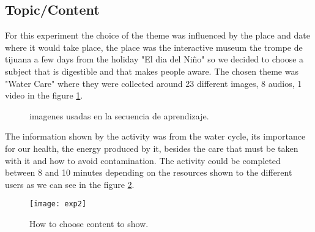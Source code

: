 \subsection{Topic/Content}
For this experiment the choice of the theme was influenced by the place and date where it would take place, the place was the interactive museum the trompe de tijuana a few days from the holiday "El dia del Niño" so we decided to choose a subject that is digestible and that makes people aware. The chosen theme was "Water Care" where they were collected around 23 different images, 8 audios, 1 video in the figure \ref{fig:agua}.
\begin{figure}[htbp]
\centering
{}\hspace{10mm}
\vspace{10mm}
\caption{imagenes usadas en la secuencia de aprendizaje.} \label{fig:agua}
\end{figure}

The information shown by the activity was from the water cycle, its importance for our health, the energy produced by it, besides the care that must be taken with it and how to avoid contamination. The activity could be completed between 8 and 10 minutes depending on the resources shown to the different users as we can see in the figure \ref{exp2}.
\begin{figure}[ht!]  
\centering  
\texttt{[image: exp2]}
\caption{How to choose content to show.}  
\label{exp2}  
\end{figure}

